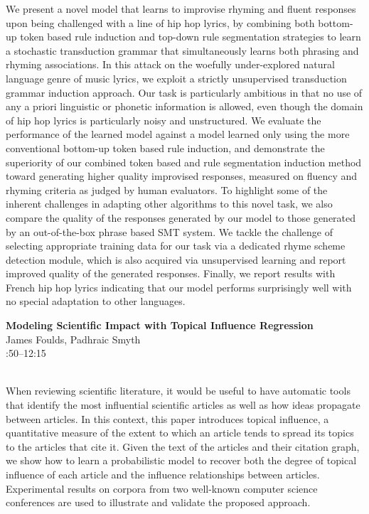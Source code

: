 \documentclass[twoside,makeidx]{book}
\renewcommand{\normalsize}{\fontsize{8}{9}\selectfont}
\renewcommand{\small}{\fontsize{7}{8}\selectfont}
\begin{document}
{\small We present a novel model that learns to improvise rhyming and fluent responses upon being challenged with a line of hip hop lyrics, by combining both bottom-up token based rule induction and top-down rule segmentation strategies to learn a stochastic transduction grammar that simultaneously learns both phrasing and rhyming associations. In this attack on the woefully under-explored natural language genre of music lyrics, we exploit a strictly unsupervised transduction grammar induction approach. Our task is particularly ambitious in that no use of any a priori linguistic or phonetic information is allowed, even though the domain of hip hop lyrics is particularly noisy and unstructured. We evaluate the performance of the learned model against a model learned only using the more conventional bottom-up token based rule induction, and demonstrate the superiority of our combined token based and rule segmentation induction method toward generating higher quality improvised responses, measured on fluency and rhyming criteria as judged by human evaluators. To highlight some of the inherent challenges in adapting other algorithms to this novel task, we also compare the quality of the responses generated by our model to those generated by an out-of-the-box phrase based SMT system. We tackle the challenge of selecting appropriate training data for our task via a dedicated rhyme scheme detection module, which is also acquired via unsupervised learning and report improved quality of the generated responses. Finally, we report results with French hip hop lyrics indicating that our model performs surprisingly well with no special adaptation to other languages.}
\par\vspace{2em}\noindent%
\begin{minipage}{\linewidth}%
\begin{center}
\textbf{\normalsize Modeling Scientific Impact with Topical Influence Regression}\\
\normalsize  James Foulds,  Padhraic Smyth\\
{\small 11:50--12:15}\\
\end{center}
\end{minipage}\\[0.5em]
\nopagebreak%
\noindent%
{\small When reviewing scientific literature, it would be useful to have automatic tools that identify the most influential scientific articles as well as how ideas propagate between articles.  In this context, this paper introduces topical influence, a quantitative measure of the extent to which an article tends to spread its topics to the articles that cite it.  Given the text of the articles and their citation graph, we show how to learn a probabilistic model to recover both the degree of topical influence of each article and the influence relationships between articles.  Experimental results on corpora from two well-known computer science conferences are used to illustrate and validate the proposed approach.}
\end{document}
